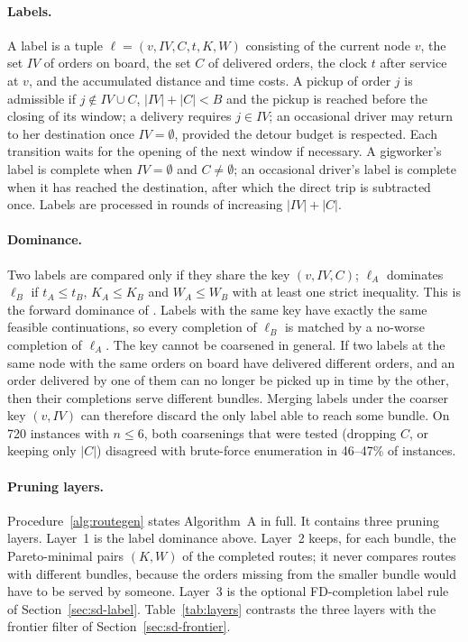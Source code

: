 \paragraph{Labels.} A label is a tuple $\ell=(v,IV,C,t,K,W)$ consisting of
the current node $v$, the set $IV$ of orders on board, the set $C$ of
delivered orders, the clock $t$ after service at $v$, and the accumulated
distance and time costs. A pickup of order $j$ is admissible if
$j\notin IV\cup C$, $|IV|+|C|<B$ and the pickup is reached before the
closing of its window; a delivery requires $j\in IV$; an occasional driver
may return to her destination once $IV=\emptyset$, provided the detour budget
is respected. Each transition waits for the opening of the next window if
necessary. A gigworker's label is complete when $IV=\emptyset$ and
$C\neq\emptyset$; an occasional driver's label is complete when it has
reached the destination, after which the direct trip is subtracted once.
Labels are processed in rounds of increasing $|IV|+|C|$.

\paragraph{Dominance.} Two labels are compared only if they share the key
$(v,IV,C)$; $\ell_A$ dominates $\ell_B$ if $t_A\le t_B$, $K_A\le K_B$ and
$W_A\le W_B$ with at least one strict inequality. This is the forward
dominance of \citet{dumas1991pickup}. Labels with the same key have exactly
the same feasible continuations, so every completion of $\ell_B$ is matched
by a no-worse completion of $\ell_A$. The key cannot be coarsened in
general. If two labels at the same node with the same orders on board have
delivered different orders, and an order delivered by one of them can no
longer be picked up in time by the other, then their completions serve
different bundles. Merging labels under the coarser key $(v,IV)$ can
therefore discard the only label able to reach some bundle. On 720 instances with $n\le 6$, both
coarsenings that were tested (dropping $C$, or keeping only $|C|$) disagreed
with brute-force enumeration in 46--47\% of instances.

\paragraph{Pruning layers.} Procedure~\ref{alg:routegen} states Algorithm~A
in full. It contains three pruning layers. Layer~1 is the label dominance
above. Layer~2 keeps, for each bundle, the Pareto-minimal pairs $(K,W)$ of
the completed routes; it never compares routes with different bundles,
because the orders missing from the smaller bundle would have to be served
by someone. Layer~3 is the optional FD-completion label rule of
Section~\ref{sec:sd-label}. Table~\ref{tab:layers} contrasts the three
layers with the frontier filter of Section~\ref{sec:sd-frontier}.

